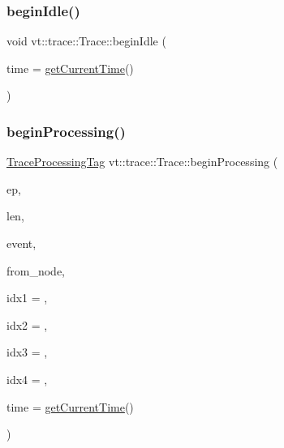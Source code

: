 \mbox{\label{structvt_1_1trace_1_1_trace_a530af1b7b48cf389744325f6f7e7f05e}} 
\subsubsection{\texorpdfstring{begin\+Idle()}{beginIdle()}}
{\footnotesize\ttfamily void vt\+::trace\+::\+Trace\+::begin\+Idle (\begin{DoxyParamCaption}\item[{double const}]{time = {\ttfamily \hyperlink{structvt_1_1trace_1_1_trace_a04cf6b76b4ced1bc90d246a34c948db5}{get\+Current\+Time}()} }\end{DoxyParamCaption})}

\mbox{\label{structvt_1_1trace_1_1_trace_a8f1a745228757b9d2ece4cd226d9540c}} 
\subsubsection{\texorpdfstring{begin\+Processing()}{beginProcessing()}}
{\footnotesize\ttfamily \hyperlink{structvt_1_1trace_1_1_trace_processing_tag}{Trace\+Processing\+Tag} vt\+::trace\+::\+Trace\+::begin\+Processing (\begin{DoxyParamCaption}\item[{\hyperlink{namespacevt_1_1trace_a3c14050715ba9eceaeff51fb3de64f2f}{Trace\+Entry\+I\+D\+Type} const}]{ep,  }\item[{\hyperlink{namespacevt_1_1trace_aeb598f45d67d41db7902e494f2f0ce59}{Trace\+Msg\+Len\+Type} const}]{len,  }\item[{\hyperlink{namespacevt_1_1trace_a64a7185f3e102df8d8258f263ccd1582}{Trace\+Event\+I\+D\+Type} const}]{event,  }\item[{\hyperlink{namespacevt_a866da9d0efc19c0a1ce79e9e492f47e2}{Node\+Type} const}]{from\+\_\+node,  }\item[{uint64\+\_\+t const}]{idx1 = {},  }\item[{uint64\+\_\+t const}]{idx2 = {},  }\item[{uint64\+\_\+t const}]{idx3 = {},  }\item[{uint64\+\_\+t const}]{idx4 = {},  }\item[{double const}]{time = {\ttfamily \hyperlink{structvt_1_1trace_1_1_trace_a04cf6b76b4ced1bc90d246a34c948db5}{get\+Current\+Time}()} }\end{DoxyParamCaption})}


